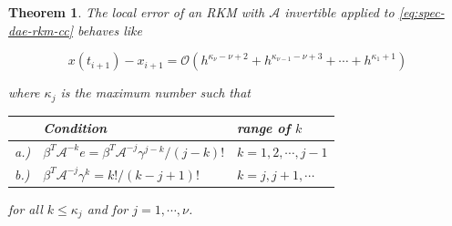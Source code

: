 \documentclass[]{book}
\newtheorem{theorem}{Theorem}[chapter]
\theoremstyle{definition}
\theoremstyle{definition}
\theoremstyle{definition}
\theoremstyle{definition}
\theoremstyle{remark}
\begin{document}
\begin{theorem}
\protect\hypertarget{thm:local-consistency-error-rkm-lcc}{}{\label{thm:local-consistency-error-rkm-lcc} }The local error of an RKM with \(\mathcal A\) invertible applied to \eqref{eq:spec-dae-rkm-cc} behaves like

\[
x(t_{i+1}) - x_{i+1} = \mathcal O(h^{\kappa_\nu - \nu + 2} + h^{\kappa_{\nu-1} - \nu + 3} + \cdots + h^{\kappa_1 +1})
\]

where \(\kappa_j\) is the maximum number such that

\begin{longtable}[]{@{}lll@{}}
\toprule
\begin{minipage}[b]{0.07\columnwidth}\raggedright
\strut
\end{minipage} & \begin{minipage}[b]{0.53\columnwidth}\raggedright
Condition\strut
\end{minipage} & \begin{minipage}[b]{0.31\columnwidth}\raggedright
range of \(k\)\strut
\end{minipage}\tabularnewline
\midrule
\endhead
\begin{minipage}[t]{0.07\columnwidth}\raggedright
a.)\strut
\end{minipage} & \begin{minipage}[t]{0.53\columnwidth}\raggedright
\(\beta^T\mathcal A^{-k}e = \beta^T\mathcal A^{-j}\gamma^{j-k} / (j-k)!\)\strut
\end{minipage} & \begin{minipage}[t]{0.31\columnwidth}\raggedright
\(k=1,2,\cdots,j-1\)\strut
\end{minipage}\tabularnewline
\begin{minipage}[t]{0.07\columnwidth}\raggedright
b.)\strut
\end{minipage} & \begin{minipage}[t]{0.53\columnwidth}\raggedright
\(\beta^T\mathcal A^{-j}\gamma^k = k! / (k-j+1)!\)\strut
\end{minipage} & \begin{minipage}[t]{0.31\columnwidth}\raggedright
\(k=j,j+1,\cdots\)\strut
\end{minipage}\tabularnewline
\bottomrule
\end{longtable}

for all \(k\leq \kappa_j\) and for \(j=1, \cdots, \nu\).
\end{theorem}
\end{document}
